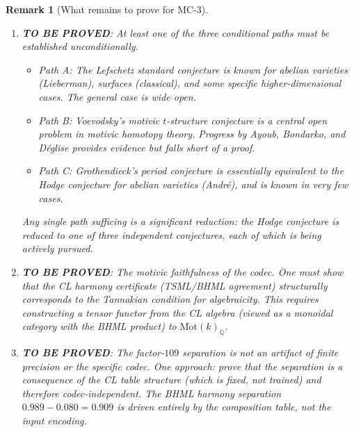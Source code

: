 \documentclass[11pt]{article}
\newtheorem{remark}[lemma]{Remark}
\theoremstyle{definition}
\begin{document}
\begin{remark}[What remains to prove for MC-3]
\label{rem:mc3-gaps}
\begin{enumerate}
  \item \textbf{TO BE PROVED}: At least one of the three conditional paths
    must be established unconditionally.
    \begin{itemize}
      \item Path A: The Lefschetz standard conjecture is known for abelian
        varieties (Lieberman), surfaces (classical), and some specific
        higher-dimensional cases.  The general case is wide open.
      \item Path B: Voevodsky's motivic $t$-structure conjecture is a
        central open problem in motivic homotopy theory.  Progress by
        Ayoub, Bondarko, and D\'eglise provides evidence but falls short
        of a proof.
      \item Path C: Grothendieck's period conjecture is essentially
        equivalent to the Hodge conjecture for abelian varieties
        (Andr\'e), and is known in very few cases.
    \end{itemize}
    Any single path sufficing is a significant reduction: the Hodge conjecture
    is reduced to one of three independent conjectures, each of which is
    being actively pursued.

  \item \textbf{TO BE PROVED}: The motivic faithfulness of the codec.
    One must show that the CL harmony certificate (TSML/BHML agreement)
    structurally corresponds to the Tannakian condition for algebraicity.
    This requires constructing a tensor functor from the CL algebra
    (viewed as a monoidal category with the BHML product) to
    $\mathrm{Mot}(k)_{\mathbb{Q}}$.

  \item \textbf{TO BE PROVED}: The factor-$109$ separation is not an
    artifact of finite precision or the specific codec.
    One approach: prove that the separation is a consequence of the
    CL table structure (which is fixed, not trained) and therefore
    codec-independent.  The BHML harmony separation $0.989 - 0.080 = 0.909$
    is driven entirely by the composition table, not the input encoding.
\end{enumerate}
\end{remark}
\end{document}
